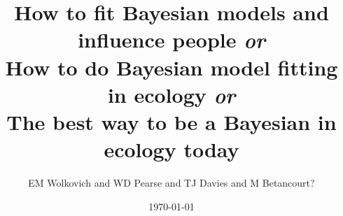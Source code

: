 \documentclass[11pt]{article}
\begin{document}

\renewcommand{\refname}{\CHead{}}




\title{How to fit Bayesian models and influence people \emph{or}\\
How to do Bayesian model fitting in ecology \emph{or}\\
The best way to be a Bayesian in ecology today}
\date{\today}
\author{EM Wolkovich and WD Pearse and TJ Davies and M Betancourt?}
\maketitle
\end{document}
